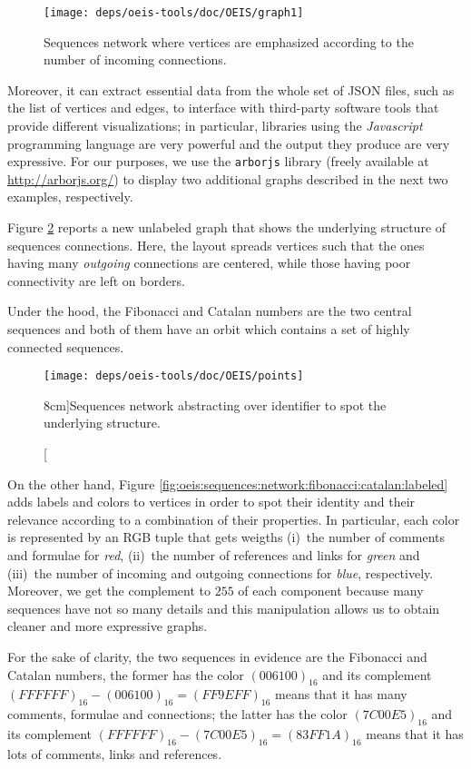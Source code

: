 \begin{figure}
\texttt{[image: deps/oeis-tools/doc/OEIS/graph1]}
\caption{Sequences network where vertices are emphasized according to the
number of incoming connections.}
\label{fig:oeis:sequences:network}
\end{figure}

Moreover, it can extract essential data from the whole set of JSON files, such
as the list of vertices and edges, to interface with third-party software tools
that provide different visualizations; in particular, libraries using the
\textit{Javascript} programming language are very powerful and the output they
produce are very expressive. For our purposes, we use the \verb|arborjs|
library (freely available at \url{http://arborjs.org/}) to display two
additional graphs described in the next two examples, respectively.

\begin{example}
Figure \ref{fig:oeis:sequences:network:fibonacci:catalan} reports a new
unlabeled graph that shows the underlying structure of sequences connections.
Here, the layout spreads vertices such that the ones having many
\textit{outgoing} connections are centered, while those having poor
connectivity are left on borders.

Under the hood, the Fibonacci and Catalan numbers are the two central sequences
and both of them have an orbit which contains a set of highly connected
sequences.
\end{example}

\begin{figure}
\texttt{[image: deps/oeis-tools/doc/OEIS/points]}
\caption[][8cm]{Sequences network abstracting over identifier to spot the underlying
structure.}
\label{fig:oeis:sequences:network:fibonacci:catalan}
\end{figure}

\begin{example}
On the other hand, Figure
\ref{fig:oeis:sequences:network:fibonacci:catalan:labeled} adds labels and
colors to vertices in order to spot their identity and their relevance
according to a combination of their properties. In particular, each color is
represented by an RGB tuple that gets weigths (i)~the number of comments and
formulae for \textit{red}, (ii)~the number of references and links for
\textit{green} and (iii)~the number of incoming and outgoing connections for
\textit{blue}, respectively. Moreover, we get the complement to $255$ of each
component because many sequences have not so many details and this manipulation
allows us to obtain cleaner and more expressive graphs.

For the sake of clarity, the two sequences in evidence are the Fibonacci and
Catalan numbers, the former has the color $(006100)_{16}$ and its complement
$(FFFFFF)_{16}-(006100)_{16}=(FF9EFF)_{16}$ means that it has many comments,
formulae and connections; the latter has the color $(7C00E5)_{16}$ and its
complement $(FFFFFF)_{16}-(7C00E5)_{16}=(83FF1A)_{16}$ means that it has lots
of comments, links and references.
\end{example}

